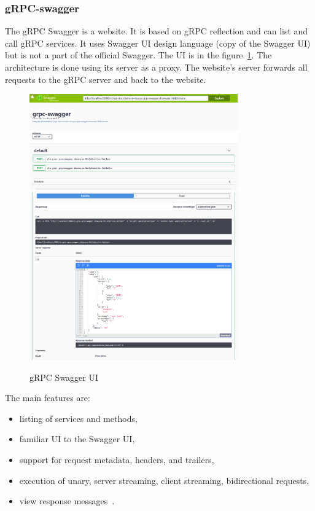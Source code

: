 \subsubsection{gRPC-swagger}
The gRPC Swagger is a website.
It is based on gRPC reflection and can list and call gRPC services.
It uses Swagger UI design language (copy of the Swagger UI) but is not a part of the official Swagger.
The UI is in the figure~\ref{fig:grpc-swagger}.
The architecture is done using its server as a proxy.
The website's server forwards all requests to the gRPC server and back to the website.
\cite{grpc-letmegrpc}

\begin{figure}[hbt!]
    \centering
    \captionsetup{justification=centering}
    \includegraphics[width=0.8\textwidth]{images/grpc/swagger-1}
    \includegraphics[width=0.8\textwidth]{images/grpc/swagger-2}
    \caption{gRPC Swagger UI~\cite{grpc-swagger}}
    \label{fig:grpc-swagger}
\end{figure}

The main features are:
\begin{itemize}
    \item listing of services and methods,
    \item familiar UI to the Swagger UI,
    \item support for request metadata, headers, and trailers,
    \item execution of unary, server streaming, client streaming, bidirectional requests,
    \item view response messages~\cite{grpc-swagger}.
\end{itemize}

